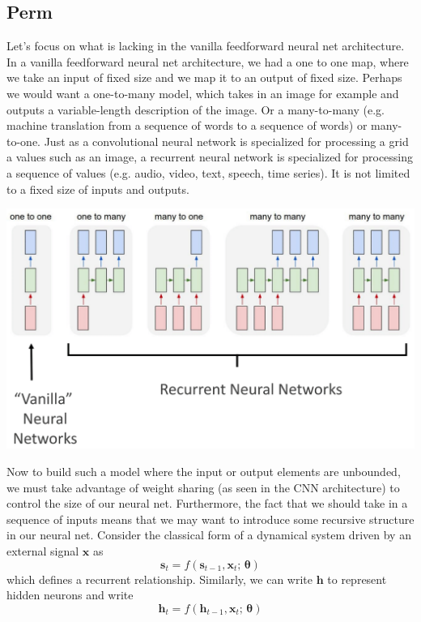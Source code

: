 \documentclass{article}
\theoremstyle{definition}
\theoremstyle{remark}
\theoremstyle{definition}
\begin{document}
\subsection{Perm}

Let's focus on what is lacking in the vanilla feedforward neural net architecture. In a vanilla feedforward neural net architecture, we had a one to one map, where we take an input of fixed size and we map it to an output of fixed size. Perhaps we would want a one-to-many model, which takes in an image for example and outputs a variable-length description of the image. Or a many-to-many (e.g. machine translation from a sequence of words to a sequence of words) or many-to-one. Just as a convolutional neural network is specialized for processing a grid a values such as an image, a recurrent neural network is specialized for processing a sequence of values (e.g. audio, video, text, speech, time series). It is not limited to a fixed size of inputs and outputs. 
\begin{center}
    \includegraphics[scale=0.25]{Images/RNNs/NNs_vs_RNN.png}
\end{center}
Now to build such a model where the input or output elements are unbounded, we must take advantage of weight sharing (as seen in the CNN architecture) to control the size of our neural net. Furthermore, the fact that we should take in a sequence of inputs means that we may want to introduce some recursive structure in our neural net. Consider the classical form of a dynamical system driven by an external signal $\mathbf{x}$ as 
\[\mathbf{s}_t = f(\mathbf{s}_{t-1}, \mathbf{x}_t; \, \boldsymbol{\theta} )\]
which defines a recurrent relationship. Similarly, we can write $\mathbf{h}$ to represent hidden neurons and write 
\[\mathbf{h}_t = f(\mathbf{h}_{t-1}, \mathbf{x}_t; \, \boldsymbol{\theta} )\]
\end{document}
